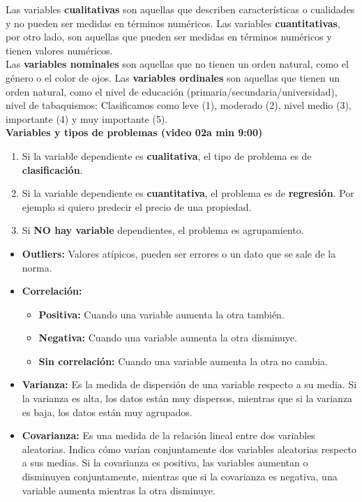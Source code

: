 \documentclass[../main.tex]{subfiles}
\begin{document}
    Las variables \textbf{cualitativas} son aquellas que describen características o cualidades y no pueden ser medidas en términos numéricos. Las variables \textbf{cuantitativas}, por otro lado, son aquellas que pueden ser medidas en términos numéricos y tienen valores numéricos.\\
		
    Las \textbf{variables nominales} son aquellas que no tienen un orden natural, como el género o el color de ojos. Las \textbf{variables ordinales} son aquellas que tienen un orden natural, como el nivel de educación (primaria/secundaria/universidad), nivel de tabaquismos: Clasificamos como leve (1), moderado (2), nivel medio (3), importante (4) y muy importante (5).\\
		 
     \textbf{Variables y tipos de problemas (video 02a min 9:00)}
     \begin{enumerate}
        \item 
            Si la variable dependiente es \textbf{cualitativa}, el tipo de problema es de \textbf{clasificación}. 
        \item 
            Si la variable dependiente es \textbf{cuantitativa}, el problema es de \textbf{regresión}.
            Por ejemplo si quiero predecir el precio de una propiedad.
        \item 
            Si \textbf{NO hay variable} dependientes, el problema es agrupamiento.
     \end{enumerate}
	 
     \begin{itemize}
        \item \textbf{Outliers:} Valores atípicos, pueden ser errores o un dato que se sale de la norma.
        \item \textbf{Correlación:} 
            \begin{itemize}
                \item \textbf{Positiva:} Cuando una variable aumenta la otra también.
                \item \textbf{Negativa:} Cuando una variable aumenta la otra disminuye.
                \item \textbf{Sin correlación:} Cuando una variable aumenta la otra no cambia.
            \end{itemize}
        \item \textbf{Varianza:} Es la medida de dispersión de una variable respecto a su media. Si la varianza es alta, los datos están muy dispersos, mientras que si la varianza es baja, los datos están muy agrupados.
        \item \textbf{Covarianza:} Es una medida de la relación lineal entre dos variables aleatorias. Indica cómo varían conjuntamente dos variables aleatorias respecto a sus medias. Si la covarianza es positiva, las variables aumentan o disminuyen conjuntamente, mientras que si la covarianza es negativa, una variable aumenta mientras la otra disminuye.
    \end{itemize}

	
\end{document}
